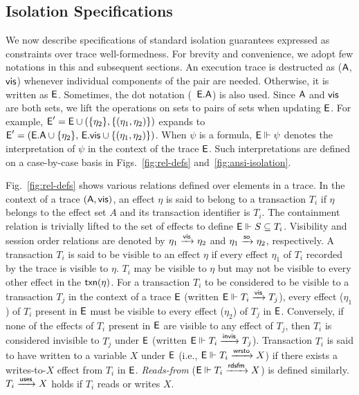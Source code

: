 \subsection{Isolation Specifications}
\label{sec:ansi-isolation}




We now describe specifications of standard isolation guarantees
expressed as constraints over trace well-formedness. For brevity and
convenience, we adopt few notations in this and subsequent sections.
An execution trace is destructed as ($\textsf{A}$,$\textsf{vis}$) whenever individual
components of the pair are needed. Otherwise, it is written as $\textsf{E}$.
Sometimes, the dot notation (\eg~$\textsf{E}.\textsf{A}$) is also used. Since $\textsf{A}$ and
$\textsf{vis}$ are both sets, we lift the operations on sets to pairs of sets
when updating $\textsf{E}$. For example, $\textsf{E}' = \textsf{E} \cup
(\{\eta_2\},\{(\eta_1,\eta_2)\})$ expands to $\textsf{E}' = (\textsf{E}.\textsf{A} \cup
\{\eta_2\},\,\textsf{E}.\textsf{vis} \cup \{(\eta_1,\eta_2)\})$.  When $\psi$ is a
formula, $\textsf{E} \Vdash \psi$ denotes the interpretation of $\psi$ in the
context of the trace $\textsf{E}$. Such interpretations are defined on a
case-by-case basis in Figs.~\ref{fig:rel-defs}
and~\ref{fig:ansi-isolation}. 

Fig.~\ref{fig:rel-defs} shows various relations defined over elements
in a trace. In the context of a trace $(\textsf{A},\textsf{vis})$, an effect $\eta$
is said to belong to a transaction $T_i$ if $\eta$ belongs to the
effect set $A$ and its transaction identifier is $T_i$. The
containment relation is trivially lifted to the set of effects to
define $\textsf{E} \Vdash S \subseteq T_i$.  Visibility and session order
relations are denoted by $\eta_1 \xrightarrow{\textsf{vis}} \eta_2$ and $\eta_1 \xrightarrow{\textsf{so}}
\eta_2$, respectively. A transaction $T_i$ is said to be visible to an
effect $\eta$ if every effect $\eta_1$ of $T_i$ recorded by the trace
is visible to $\eta$.  $T_i$ may be visible to $\eta$ but may not be
visible to every other effect in the $\textsf{txn}(\eta)$. For a transaction
$T_i$ to be considered to be visible to a transaction $T_j$ in the
context of a trace $\textsf{E}$ (written $\textsf{E} \Vdash T_i \xrightarrow{\textsf{vis}} T_j$), every
effect ($\eta_1$) of $T_i$ present in $\textsf{E}$ must be visible to every
effect ($\eta_2$) of $T_j$ in $\textsf{E}$.  Conversely, if none of the
effects of $T_i$ present in $\textsf{E}$ are visible to any effect of $T_j$,
then $T_i$ is considered invisible to $T_j$ under $\textsf{E}$ (written
$\textsf{E} \Vdash T_i \xrightarrow{\textsf{invis}} T_j$). Transaction $T_i$ is said to have
written to a variable $X$ under $\textsf{E}$ (i.e., $\textsf{E} \Vdash T_i \xrightarrow{\textsf{wrsto}} X$)
if there exists a writes-to-$X$ effect from $T_i$ in $\textsf{E}$.
\emph{Reads-from} ($\textsf{E} \Vdash T_i \xrightarrow{\textsf{rdsfm}} X$) is defined similarly.
$T_i \xrightarrow{\textsf{uses}} X$ holds if $T_i$ reads or writes $X$.

